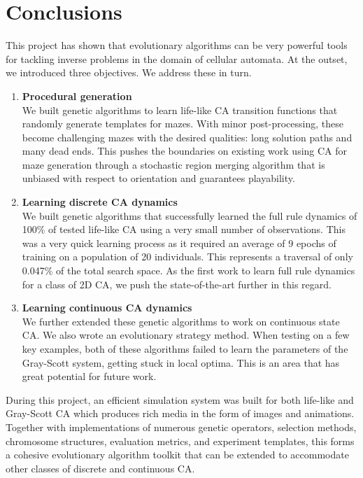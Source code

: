\chapter{Conclusions}

This project has shown that evolutionary algorithms can be very powerful tools for tackling inverse problems in the domain of cellular automata. At the outset, we introduced three objectives. We address these in turn.
\begin{enumerate}
    \item \textbf{Procedural generation}\\
    We built genetic algorithms to learn life-like CA transition functions that randomly generate templates for mazes. With minor post-processing, these become challenging mazes with the desired qualities: long solution paths and many dead ends. This pushes the boundaries on existing work using CA for maze generation\cite{adams2017procedural, adams2018evolving} through a stochastic region merging algorithm that is unbiased with respect to orientation and guarantees playability.
    \item \textbf{Learning discrete CA dynamics}\\
    We built genetic algorithms that successfully learned the full rule dynamics of 100\% of tested life-like CA using a very small number of observations. This was a very quick learning process as it required an average of 9 epochs of training on a population of 20 individuals. This represents a traversal of only 0.047\% of the total search space. As the first work to learn full rule dynamics for a class of 2D CA, we push the state-of-the-art further in this regard.
    \item \textbf{Learning continuous CA dynamics}\\
    We further extended these genetic algorithms to work on continuous state CA. We also wrote an evolutionary strategy method. When testing on a few key examples, both of these algorithms failed to learn the parameters of the Gray-Scott system, getting stuck in local optima. This is an area that has great potential for future work.
\end{enumerate}

During this project, an efficient simulation system was built for both life-like and Gray-Scott CA which produces rich media in the form of images and animations. Together with implementations of numerous genetic operators, selection methods, chromosome structures, evaluation metrics, and experiment templates, this forms a cohesive evolutionary algorithm toolkit that can be extended to accommodate other classes of discrete and continuous CA.

